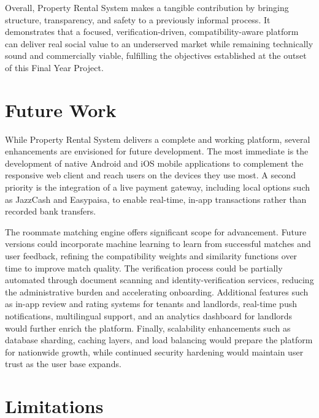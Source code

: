 Overall, Property Rental System makes a tangible contribution by bringing structure, transparency, and safety to a previously informal process. It demonstrates that a focused, verification-driven, compatibility-aware platform can deliver real social value to an underserved market while remaining technically sound and commercially viable, fulfilling the objectives established at the outset of this Final Year Project.


\section{Future Work}

While Property Rental System delivers a complete and working platform, several enhancements are envisioned for future development. The most immediate is the development of native Android and iOS mobile applications to complement the responsive web client and reach users on the devices they use most. A second priority is the integration of a live payment gateway, including local options such as JazzCash and Easypaisa, to enable real-time, in-app transactions rather than recorded bank transfers.

The roommate matching engine offers significant scope for advancement. Future versions could incorporate machine learning to learn from successful matches and user feedback, refining the compatibility weights and similarity functions over time to improve match quality. The verification process could be partially automated through document scanning and identity-verification services, reducing the administrative burden and accelerating onboarding. Additional features such as in-app review and rating systems for tenants and landlords, real-time push notifications, multilingual support, and an analytics dashboard for landlords would further enrich the platform. Finally, scalability enhancements such as database sharding, caching layers, and load balancing would prepare the platform for nationwide growth, while continued security hardening would maintain user trust as the user base expands.


\section{Limitations}

